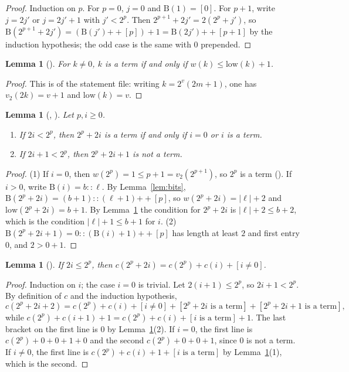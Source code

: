 \documentclass[11pt]{amsart}
\theoremstyle{plain}
\newtheorem{lemma}[theorem]{Lemma}
\theoremstyle{definition}
\newcommand{\Bits}{\mathrm{B}}
\newcommand{\low}{\mathrm{low}}
\begin{document}
\begin{proof}
Induction on $p$. For $p=0$, $j=0$ and $\Bits(1)=[0]$. For $p+1$, write $j=2j'$ or $j=2j'+1$ with $j'<2^p$. Then $2^{p+1}+2j'=2(2^p+j')$, so $\Bits(2^{p+1}+2j')=(\Bits(j')\mathbin{+\!\!+}[p])+1=\Bits(2j')\mathbin{+\!\!+}[p+1]$ by the induction hypothesis; the odd case is the same with $0$ prepended.
\end{proof}

\begin{lemma}[]\label{lem:term}
For $k\ne0$, $k$ is a term if and only if $w(k)\le\low(k)+1$.
\end{lemma}

\begin{proof}
This is  of the statement file: writing $k=2^v(2m+1)$, one has $v_2(2k)=v+1$ and $\low(k)=v$.
\end{proof}

\begin{lemma}[, ]\label{lem:structure}
Let $p,i\ge0$.
\begin{enumerate}
\item If $2i<2^p$, then $2^p+2i$ is a term if and only if $i=0$ or $i$ is a term.
\item If $2i+1<2^p$, then $2^p+2i+1$ is not a term.
\end{enumerate}
\end{lemma}

\begin{proof}
(1) If $i=0$, then $w(2^p)=1\le p+1=v_2(2^{p+1})$, so $2^p$ is a term (). If $i>0$, write $\Bits(i)=b::\ell$. By Lemma~\ref{lem:bits}, $\Bits(2^p+2i)=(b+1)::(\ell+1)\mathbin{+\!\!+}[p]$, so $w(2^p+2i)=|\ell|+2$ and $\low(2^p+2i)=b+1$. By Lemma~\ref{lem:term} the condition for $2^p+2i$ is $|\ell|+2\le b+2$, which is the condition $|\ell|+1\le b+1$ for $i$.
(2) $\Bits(2^p+2i+1)=0::(\Bits(i)+1)\mathbin{+\!\!+}[p]$ has length at least $2$ and first entry $0$, and $2>0+1$.
\end{proof}

\begin{lemma}[]\label{lem:count}
If $2i\le2^p$, then $c(2^p+2i)=c(2^p)+c(i)+[i\ne0]$.
\end{lemma}

\begin{proof}
Induction on $i$; the case $i=0$ is trivial. Let $2(i+1)\le2^p$, so $2i+1<2^p$. By definition of $c$ and the induction hypothesis,
\[
c(2^p+2i+2)=c(2^p)+c(i)+[i\ne0]+[2^p+2i\text{ is a term}]+[2^p+2i+1\text{ is a term}],
\]
while $c(2^p)+c(i+1)+1=c(2^p)+c(i)+[i\text{ is a term}]+1$. The last bracket on the first line is $0$ by Lemma~\ref{lem:structure}(2). If $i=0$, the first line is $c(2^p)+0+0+1+0$ and the second $c(2^p)+0+0+1$, since $0$ is not a term. If $i\ne0$, the first line is $c(2^p)+c(i)+1+[i\text{ is a term}]$ by Lemma~\ref{lem:structure}(1), which is the second.
\end{proof}
\end{document}
